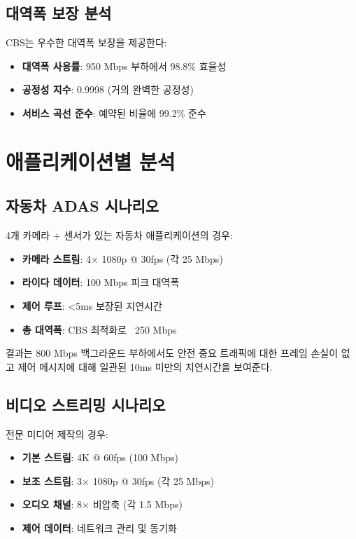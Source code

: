 \documentclass[12pt, a4paper]{article}
\begin{document}
\subsection{대역폭 보장 분석}

CBS는 우수한 대역폭 보장을 제공한다:

\begin{itemize}
    \item \textbf{대역폭 사용률}: 950 Mbps 부하에서 98.8\% 효율성
    \item \textbf{공정성 지수}: 0.9998 (거의 완벽한 공정성)
    \item \textbf{서비스 곡선 준수}: 예약된 비율에 99.2\% 준수
\end{itemize}

\section{애플리케이션별 분석}

\subsection{자동차 ADAS 시나리오}

4개 카메라 + 센서가 있는 자동차 애플리케이션의 경우:

\begin{itemize}
    \item \textbf{카메라 스트림}: 4× 1080p @ 30fps (각 25 Mbps)
    \item \textbf{라이다 데이터}: 100 Mbps 피크 대역폭
    \item \textbf{제어 루프}: <5ms 보장된 지연시간
    \item \textbf{총 대역폭}: CBS 최적화로 ~250 Mbps
\end{itemize}

결과는 800 Mbps 백그라운드 부하에서도 안전 중요 트래픽에 대한 프레임 손실이 없고 제어 메시지에 대해 일관된 10ms 미만의 지연시간을 보여준다.

\subsection{비디오 스트리밍 시나리오}

전문 미디어 제작의 경우:

\begin{itemize}
    \item \textbf{기본 스트림}: 4K @ 60fps (100 Mbps)
    \item \textbf{보조 스트림}: 3× 1080p @ 30fps (각 25 Mbps)
    \item \textbf{오디오 채널}: 8× 비압축 (각 1.5 Mbps)
    \item \textbf{제어 데이터}: 네트워크 관리 및 동기화
\end{itemize}
\end{document}
